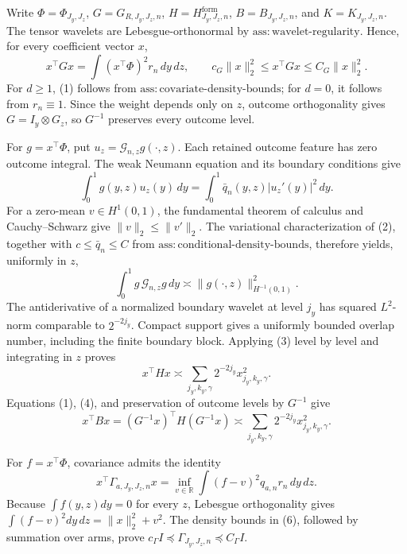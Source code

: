 Write \(\Phi=\Phi_{J_y,J_z}\), \(G=G_{R,J_y,J_z,n}\), \(H=H^{\mathrm{form}}_{J_y,J_z,n}\), \(B=B_{J_y,J_z,n}\), and \(K=K_{J_y,J_z,n}\).  The tensor wavelets are Lebesgue-orthonormal by \(\mathrm{ass{:}wavelet\text{-}regularity}\).  Hence, for every coefficient vector \(x\),
\[
x^{\top}Gx=\int (x^{\top}\Phi)^2r_n\,dy\,dz,
\qquad c_G\|x\|_2^2\le x^{\top}Gx\le C_G\|x\|_2^2. \tag{1}
\]
For \(d\ge1\), (1) follows from \(\mathrm{ass{:}covariate\text{-}density\text{-}bounds}\); for \(d=0\), it follows from \(r_n\equiv1\).  Since the weight depends only on \(z\), outcome orthogonality gives \(G=I_y\otimes G_z\), so \(G^{-1}\) preserves every outcome level.

For \(g=x^{\top}\Phi\), put \(u_z=\mathcal G_{n,z}g(\cdot,z)\).  Each retained outcome feature has zero outcome integral.  The weak Neumann equation and its boundary conditions give
\[
\int_0^1g(y,z)u_z(y)\,dy
=\int_0^1\bar q_n(y,z)|u_z'(y)|^2\,dy. \tag{2}
\]
For a zero-mean \(v\in H^1(0,1)\), the fundamental theorem of calculus and Cauchy--Schwarz give \(\|v\|_2\le\|v'\|_2\).  The variational characterization of (2), together with \(c\le\bar q_n\le C\) from \(\mathrm{ass{:}conditional\text{-}density\text{-}bounds}\), therefore yields, uniformly in \(z\),
\[
\int_0^1g\,\mathcal G_{n,z}g\,dy\asymp
\|g(\cdot,z)\|_{H^{-1}(0,1)}^2. \tag{3}
\]
The antiderivative of a normalized boundary wavelet at level \(j_y\) has squared \(L^2\)-norm comparable to \(2^{-2j_y}\).  Compact support gives a uniformly bounded overlap number, including the finite boundary block.  Applying (3) level by level and integrating in \(z\) proves
\[
x^{\top}Hx\asymp
\sum_{j_y,k_y,\gamma}2^{-2j_y}x_{j_y,k_y,\gamma}^2. \tag{4}
\]
Equations (1), (4), and preservation of outcome levels by \(G^{-1}\) give
\[
x^{\top}Bx=(G^{-1}x)^{\top}H(G^{-1}x)
\asymp\sum_{j_y,k_y,\gamma}2^{-2j_y}x_{j_y,k_y,\gamma}^2. \tag{5}
\]

For \(f=x^{\top}\Phi\), covariance admits the identity
\[
x^{\top}\Gamma_{a,J_y,J_z,n}x
=\inf_{v\in\mathbb R}\int(f-v)^2q_{a,n}r_n\,dy\,dz. \tag{6}
\]
Because \(\int f(y,z)dy=0\) for every \(z\), Lebesgue orthogonality gives \(\int(f-v)^2dy\,dz=\|x\|_2^2+v^2\).  The density bounds in (6), followed by summation over arms, prove \(c_\Gamma I\preceq\Gamma_{J_y,J_z,n}\preceq C_\Gamma I\).

